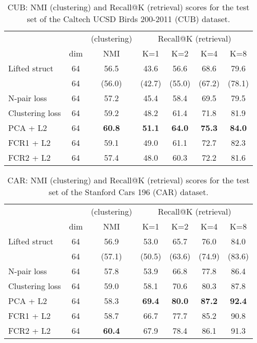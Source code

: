 \documentclass[9pt,technote,compsoc]{./sty/IEEEtran}
\begin{document}
\begin{table*}
	\centering
	\caption{CUB: NMI (clustering) and Recall@K (retrieval) scores for the test set of the Caltech UCSD Birds 200-2011 (CUB) dataset.}
	\label{tbl:CUB}
	\begin{tabular}{lcccccc}\toprule
		&&(clustering)&\multicolumn{4}{c}{Recall@K (retrieval)}\\\cmidrule(lr){4-7}
		&dim&NMI&K=1&K=2&K=4&K=8\\\midrule
		Lifted struct \cite{song2016deep}&64&56.5&43.6&56.6&68.6&79.6\\
                                                          &64&(56.0)&(42.7)&(55.0)&(67.2)&(78.1)\\
		N-pair loss \cite{sohn2016improved}&64&57.2&45.4&58.4&69.5&79.5\\
		Clustering loss \cite{song2017learnable}&64&59.2&48.2&61.4&71.8&81.9\\
		PCA + L2&64&\textbf{60.8}&\textbf{51.1}&\textbf{64.0}&\textbf{75.3}&\textbf{84.0}\\
		FCR1 + L2&64&59.1&49.0&61.1&72.7&82.3\\
		FCR2 + L2&64&57.4&48.0&60.3&72.2&81.6\\\bottomrule
	\end{tabular}
\end{table*}
\begin{table*}
	\centering
	\caption{CAR: NMI (clustering) and Recall@K (retrieval) scores for the test set of the Stanford Cars 196 (CAR) dataset.}
	\label{tbl:CAR}
	\begin{tabular}{lcccccc}\toprule
		&&(clustering)&\multicolumn{4}{c}{Recall@K (retrieval)}\\\cmidrule(lr){4-7}
		&dim&NMI&K=1&K=2&K=4&K=8\\\midrule
		Lifted struct \cite{song2016deep}&64&56.9&53.0&65.7&76.0&84.0\\
		                                             &64&(57.1)&(50.5)&(63.6)&(74.9)&(83.6)\\
		N-pair loss \cite{sohn2016improved}&64&57.8&53.9&66.8&77.8&86.4\\
		Clustering loss \cite{song2017learnable}&64&59.0&58.1&70.6&80.3&87.8\\
		PCA + L2&64&58.3&\textbf{69.4}&\textbf{80.0}&\textbf{87.2}&\textbf{92.4}\\
		FCR1 + L2&64&58.7&66.7&77.7&85.2&90.8\\
		FCR2 + L2&64&\textbf{60.4}&67.9&78.4&86.1&91.3\\\bottomrule
	\end{tabular}
\end{table*}
\end{document}
